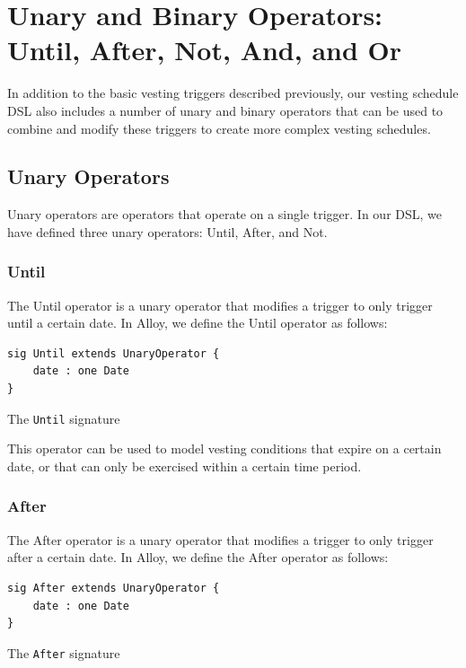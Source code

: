 \section{Unary and Binary Operators: Until, After, Not, And, and Or}

In addition to the basic vesting triggers described previously, our vesting schedule DSL also includes a number of unary and binary operators that can be used to combine and modify these triggers to create more complex vesting schedules.

\subsection{Unary Operators}

Unary operators are operators that operate on a single trigger. In our DSL, we have defined three unary operators: Until, After, and Not.

\subsubsection{Until}

The Until operator is a unary operator that modifies a trigger to only trigger until a certain date. In Alloy, we define the Until operator as follows:

\begin{listing}[!h]
\begin{verbatim}
sig Until extends UnaryOperator {
    date : one Date
}
\end{verbatim}
\caption{The \texttt{Until} signature}
\label{lst:until-signature}
\end{listing}



This operator can be used to model vesting conditions that expire on a certain date, or that can only be exercised within a certain time period.

\subsubsection{After}

The After operator is a unary operator that modifies a trigger to only trigger after a certain date. In Alloy, we define the After operator as follows:


\begin{listing}[!h]
\begin{verbatim}
sig After extends UnaryOperator {
    date : one Date
}
\end{verbatim}
\caption{The \texttt{After} signature}
\label{lst:after-signature}
\end{listing}


